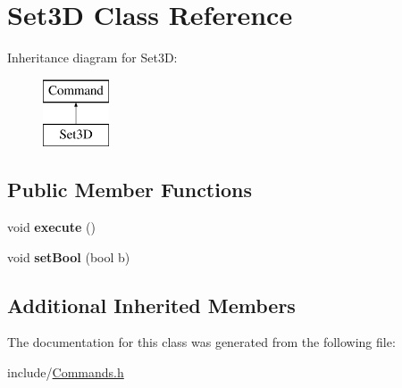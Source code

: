 \hypertarget{classSet3D}{\section{Set3\-D Class Reference}
\label{classSet3D}
}
Inheritance diagram for Set3\-D\-:\begin{figure}[H]
\begin{center}
\leavevmode
\includegraphics[height=2.000000cm]{classSet3D}
\end{center}
\end{figure}
\subsection*{Public Member Functions}
\begin{DoxyCompactItemize}
\item 
\hypertarget{classSet3D_a5862aab17e7e55c4a6a65fce27d8df74}{void {\bfseries execute} ()}\label{classSet3D_a5862aab17e7e55c4a6a65fce27d8df74}

\item 
\hypertarget{classSet3D_a10faf70f86f5dfe566e94a50f683b4f0}{void {\bfseries set\-Bool} (bool b)}\label{classSet3D_a10faf70f86f5dfe566e94a50f683b4f0}

\end{DoxyCompactItemize}
\subsection*{Additional Inherited Members}


The documentation for this class was generated from the following file\-:\begin{DoxyCompactItemize}
\item 
include/\hyperlink{Commands_8h}{Commands.\-h}\end{DoxyCompactItemize}

